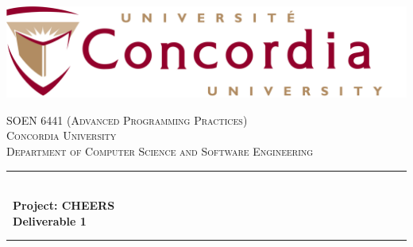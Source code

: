 \begin{titlepage}

\newcommand{\HRule}{\rule{\linewidth}{0.5mm}} %


\includegraphics[width=14cm]{images/uni_logo.png}\\[2cm] %
 

\center %


\textsc{\LARGE SOEN 6441 (Advanced Programming Practices)}\\[0.5cm] %
\textsc{\large Concordia University}\\[0.1cm] %
\textsc{\large Department of Computer Science and Software Engineering}\\[1.5cm] %

\makeatletter
\HRule \\[0.4cm]
{ \huge \bfseries \ Project: CHEERS}\\[0.4cm]
{ \huge \bfseries \ Deliverable 1}\\[0.4cm] %
\HRule \\[1.5cm]


\end{titlepage}
